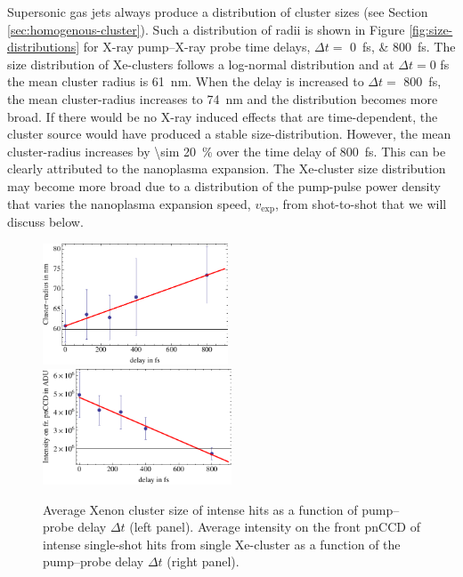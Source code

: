 Supersonic gas jets always produce a distribution of cluster sizes (see Section \ref{sec:homogenous-cluster}). Such a distribution of radii is shown in Figure \ref{fig:size-distributions} for X-ray pump--X-ray probe time delays, $\Delta t =$ \SIlist{0;800}{\femto\second}. The size distribution of Xe-clusters follows a log-normal distribution \citep{Schutte-2002-IJMS} and at $\Delta t=0$ fs the mean cluster radius is \SI{61}{\nano\meter}. When the delay is increased to $\Delta t=$ \SI{800}{\femto\second}, the mean cluster-radius increases to \SI{74}{\nano\meter} and the distribution becomes more broad. If there would be no X-ray induced effects that are time-dependent, the cluster source would have produced a stable size-distribution. However, the mean cluster-radius increases by \SI{\sim 20}{\percent} over the time delay of \SI{800}{\femto\second}. This can be clearly attributed to the nanoplasma expansion. The Xe-cluster size distribution may become more broad due to a distribution of the pump-pulse power density that varies the nanoplasma expansion speed, $v_{\text{exp}}$, from shot-to-shot that we will discuss below.\\[1\baselineskip]
%
\begin{figure}
	\centering
		\includegraphics[width=0.49\textwidth]{images/filter-size.pdf}
		\includegraphics[width=0.50\textwidth]{images/filter-sum-frontpnCCD.pdf}
	\caption[Average cluster size correlated to measured intensity on front pnCCD.]{Average Xenon cluster size of intense hits as a function of pump--probe delay $\Delta t$ (left panel). Average intensity on the front pnCCD of intense single-shot hits from single Xe-cluster as a function of the pump--probe delay $\Delta t$ (right panel).}
	\label{fig:filter-size-intensity}
\end{figure}

